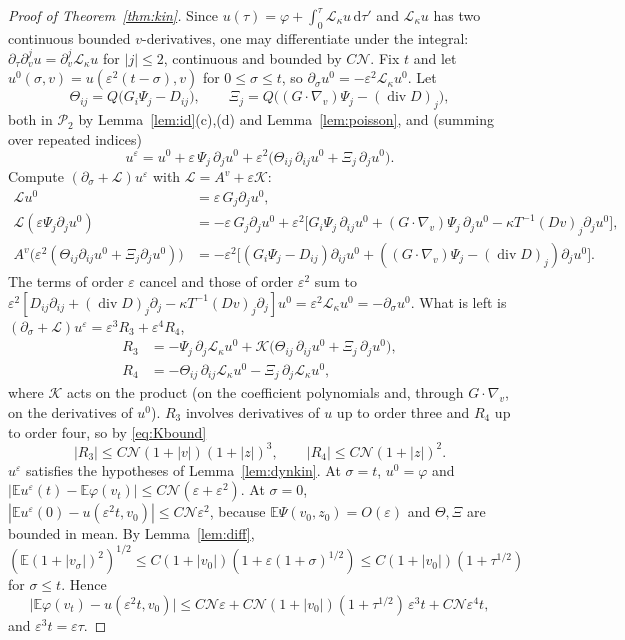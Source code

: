 \documentclass[11pt]{article}
\newcommand{\dd}{\mathrm{d}}
\newcommand{\E}{\mathbb{E}}
\newcommand{\eps}{\varepsilon}
\newcommand{\cL}{\mathcal{L}}
\newcommand{\cK}{\mathcal{K}}
\newcommand{\cP}{\mathcal{P}}
\newcommand{\Div}{\operatorname{div}}
\theoremstyle{remark}
\begin{document}
\begin{proof}[Proof of Theorem~\ref{thm:kin}]
Since $u(\tau)=\varphi+\int_0^\tau\cL_\kappa u\,\dd\tau'$ and
$\cL_\kappa u$ has two continuous bounded $v$-derivatives, one may
differentiate under the integral:
$\partial_\tau\partial_v^ju=\partial_v^j\cL_\kappa u$ for $|j|\le2$,
continuous and bounded by $C\mathcal{N}$. Fix $t$ and let
$u^0(\sigma,v)=u(\eps^2(t-\sigma),v)$ for $0\le\sigma\le t$, so
$\partial_\sigma u^0=-\eps^2\cL_\kappa u^0$. Let
\[
  \Theta_{ij}=Q\bigl(G_i\Psi_j-D_{ij}\bigr),\qquad
  \Xi_j=Q\bigl((G\cdot\nabla_v)\Psi_j-(\Div D)_j\bigr),
\]
both in $\cP_2$ by Lemma~\ref{lem:id}(c),(d) and Lemma~\ref{lem:poisson},
and (summing over repeated indices)
\[
  u^\eps=u^0+\eps\,\Psi_j\,\partial_ju^0
   +\eps^2\bigl(\Theta_{ij}\,\partial_{ij}u^0+\Xi_j\,\partial_ju^0\bigr).
\]
Compute $(\partial_\sigma+\cL)u^\eps$ with $\cL=A^v+\eps\cK$:
\begin{align*}
  \cL u^0&=\eps\,G_j\partial_ju^0,\\
  \cL(\eps\Psi_j\partial_ju^0)&=-\eps\,G_j\partial_ju^0
    +\eps^2\bigl[G_i\Psi_j\,\partial_{ij}u^0
      +(G\cdot\nabla_v)\Psi_j\,\partial_ju^0
      -\kappa T^{-1}(Dv)_j\partial_ju^0\bigr],\\
  A^v\bigl(\eps^2(\Theta_{ij}\partial_{ij}u^0+\Xi_j\partial_ju^0)\bigr)
   &=-\eps^2\bigl[(G_i\Psi_j-D_{ij})\partial_{ij}u^0
     +((G\cdot\nabla_v)\Psi_j-(\Div D)_j)\partial_ju^0\bigr].
\end{align*}
The terms of order $\eps$ cancel and those of order $\eps^2$ sum to
$\eps^2[D_{ij}\partial_{ij}+(\Div D)_j\partial_j-\kappa T^{-1}(Dv)_j\partial_j]u^0
=\eps^2\cL_\kappa u^0=-\partial_\sigma u^0$. What is left is
$(\partial_\sigma+\cL)u^\eps=\eps^3R_3+\eps^4R_4$,
\begin{align*}
  R_3&=-\Psi_j\,\partial_j\cL_\kappa u^0
     +\cK\bigl(\Theta_{ij}\,\partial_{ij}u^0+\Xi_j\,\partial_ju^0\bigr),\\
  R_4&=-\Theta_{ij}\,\partial_{ij}\cL_\kappa u^0-\Xi_j\,\partial_j\cL_\kappa u^0 ,
\end{align*}
where $\cK$ acts on the product (on the coefficient polynomials and, through
$G\cdot\nabla_v$, on the derivatives of $u^0$). $R_3$ involves derivatives
of $u$ up to order three and $R_4$ up to order four, so by
\eqref{eq:Kbound}
\[
  |R_3|\le C\mathcal{N}(1+|v|)(1+|z|)^3,\qquad
  |R_4|\le C\mathcal{N}(1+|z|)^2 .
\]
$u^\eps$ satisfies the hypotheses of Lemma~\ref{lem:dynkin}. At $\sigma=t$,
$u^0=\varphi$ and $|\E u^\eps(t)-\E\varphi(v_t)|\le C\mathcal{N}(\eps+\eps^2)$.
At $\sigma=0$, $|\E u^\eps(0)-u(\eps^2t,v_0)|\le C\mathcal{N}\eps^2$, because
$\E\Psi(v_0,z_0)=O(\eps)$ and $\Theta,\Xi$ are bounded in mean. By
Lemma~\ref{lem:diff},
$(\E(1+|v_\sigma|)^2)^{1/2}\le C(1+|v_0|)(1+\eps(1+\sigma)^{1/2})
\le C(1+|v_0|)(1+\tau^{1/2})$ for $\sigma\le t$. Hence
\[
  \bigl|\E\varphi(v_t)-u(\eps^2t,v_0)\bigr|
  \le C\mathcal{N}\eps+C\mathcal{N}(1+|v_0|)(1+\tau^{1/2})\,\eps^3t
     +C\mathcal{N}\eps^4t ,
\]
and $\eps^3t=\eps\tau$.
\end{proof}
\end{document}
